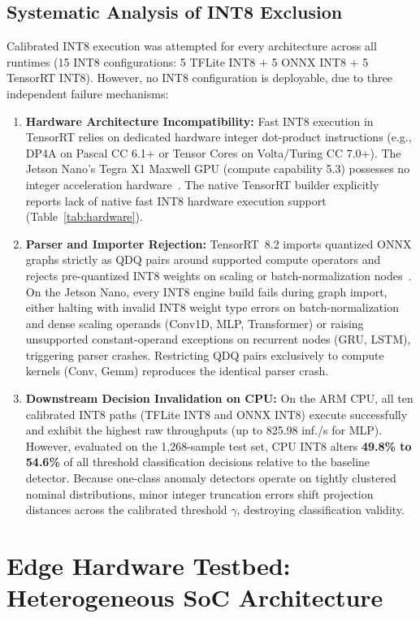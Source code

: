 \documentclass[11pt,a4paper]{article}
\begin{document}
\subsection{Systematic Analysis of INT8 Exclusion}
\label{sec:int8-exclusion}
Calibrated INT8 execution was attempted for every architecture across all runtimes (15 INT8 configurations: 5 TFLite INT8 $+$ 5 ONNX INT8 $+$ 5 TensorRT INT8). However, no INT8 configuration is deployable, due to three independent failure mechanisms:
\begin{enumerate}
    \item \textbf{Hardware Architecture Incompatibility:} Fast INT8 execution in TensorRT relies on dedicated hardware integer dot-product instructions (e.g., DP4A on Pascal CC 6.1+ or Tensor Cores on Volta/Turing CC 7.0+). The Jetson Nano's Tegra X1 Maxwell GPU (compute capability 5.3) possesses no integer acceleration hardware~\cite{nvidia2021tensorrt82matrix}. The native TensorRT builder explicitly reports lack of native fast INT8 hardware execution support (Table~\ref{tab:hardware}).
    \item \textbf{Parser and Importer Rejection:} TensorRT~8.2 imports quantized ONNX graphs strictly as QDQ pairs around supported compute operators and rejects pre-quantized INT8 weights on scaling or batch-normalization nodes~\cite{nvidia2021tensorrt82guide}. On the Jetson Nano, every INT8 engine build fails during graph import, either halting with invalid INT8 weight type errors on batch-normalization and dense scaling operands (Conv1D, MLP, Transformer) or raising unsupported constant-operand exceptions on recurrent nodes (GRU, LSTM), triggering parser crashes. Restricting QDQ pairs exclusively to compute kernels (Conv, Gemm) reproduces the identical parser crash.
    \item \textbf{Downstream Decision Invalidation on CPU:} On the ARM CPU, all ten calibrated INT8 paths (TFLite INT8 and ONNX INT8) execute successfully and exhibit the highest raw throughputs (up to 825.98 inf./s for MLP). However, evaluated on the 1,268-sample test set, CPU INT8 alters \textbf{49.8\% to 54.6\%} of all threshold classification decisions relative to the baseline detector. Because one-class anomaly detectors operate on tightly clustered nominal distributions, minor integer truncation errors shift projection distances across the calibrated threshold $\gamma$, destroying classification validity.
\end{enumerate}

\section{Edge Hardware Testbed: Heterogeneous SoC Architecture}
\label{sec:hardware}
\end{document}

